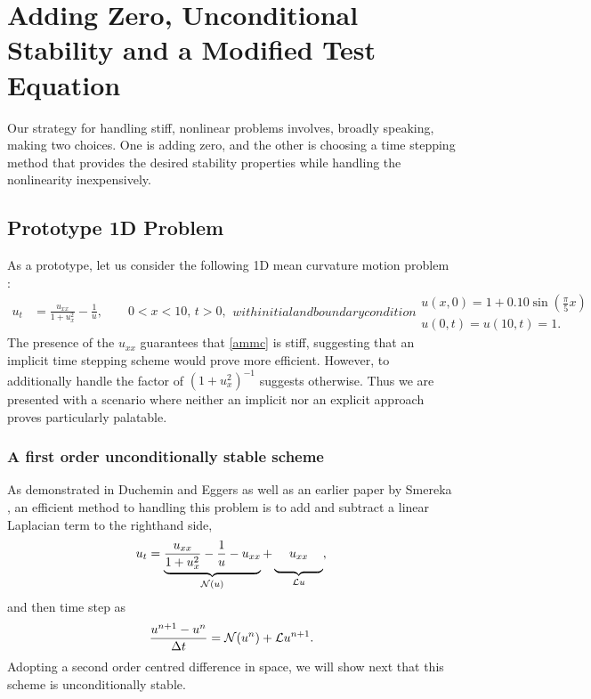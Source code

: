 \chapter{Adding Zero, Unconditional Stability and a Modified Test Equation}
Our strategy for handling stiff, nonlinear problems involves, broadly speaking, making two choices. One is adding zero, and the other is choosing a time stepping method that provides the desired stability properties while handling the nonlinearity inexpensively. 

\section{Prototype 1D Problem}
As a prototype, let us consider the following 1D mean curvature motion problem \cite{duchemin2014explicit}: 
\begin{subequations} 
\begin{align}
u_t &= \frac{u_{xx}}{1 + u_x^2} - \frac{1}{u}, 
\qquad 0 < x < 10, \, t > 0,
\end{align}
with initial and boundary condition
\begin{gather}
u(x,0) = 1 + 0.10\sin\left( \frac{\pi}{5}x \right) 
\\
u(0,t)=u(10,t)=1.
\end{gather}
\label{ammc}
\end{subequations}
The presence of the $u_{xx}$ guarantees that \eqref{ammc} is stiff, suggesting that an implicit time stepping scheme would prove more efficient. However, to additionally handle the factor of $(1+u_x^2)^{-1}$ suggests otherwise. Thus we are presented with a scenario where neither an implicit nor an explicit approach proves particularly palatable.

\subsection{A first order unconditionally stable scheme}
As demonstrated in Duchemin and Eggers \cite{duchemin2014explicit} as well as an earlier paper by Smereka \cite{smereka2003semi}, an efficient method to handling this problem is to add and subtract a linear Laplacian term to the righthand side, 
\begin{align}
u_t = \underbrace{\frac{u_{xx}}{1 + u_x^2} 
- \frac{1}{u} 
- u_{xx}}_{\N(u)} 
+ \underbrace{\phantom{\frac{1_1}{1}}u_{xx}\phantom{\frac{1}{1_1}}}_{\L u}, 
\label{ammc +- uxx}
\end{align} 
and then time step as 
\begin{align}
\frac{u^{n+1} - u^n}{\Delta t} 
= \mathcal{N}(u^n) + \mathcal{L} u^{n+1}.
\label{ammc sbdf1}
\end{align}
Adopting a second order centred difference in space, we will show next that this scheme is unconditionally stable.

